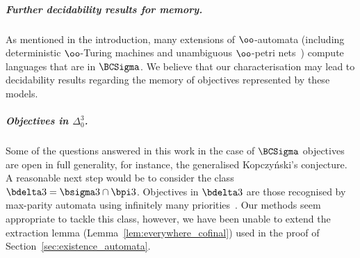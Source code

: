\subparagraph*{Further decidability results for memory.} As mentioned in the introduction, many extensions of $\oo$-automata (including deterministic $\oo$-Turing machines and unambiguous $\oo$-petri nets~\cite{FSJLS22}) compute languages that are in $\BCSigma$.
We believe that our characterisation may lead to decidability results regarding the memory of objectives represented by these models.

\subparagraph*{Objectives in $\Delta_0^3$.} Some of the questions answered in this work in the case of $\BCSigma$ objectives are open in full generality, for instance, the generalised Kopczy\'nski's conjecture. A reasonable next step would be to consider the class $\bdelta 3 = \bsigma 3 \cap \bpi 3$.
Objectives in $\bdelta 3$ are those recognised by max-parity automata using infinitely many priorities~\cite{Skrzypczak13Colorings}.
Our methods seem appropriate to tackle this class, however, we have been unable to extend the extraction lemma (Lemma~\ref{lem:everywhere_cofinal}) used in the proof of Section~\ref{sec:existence_automata}.




